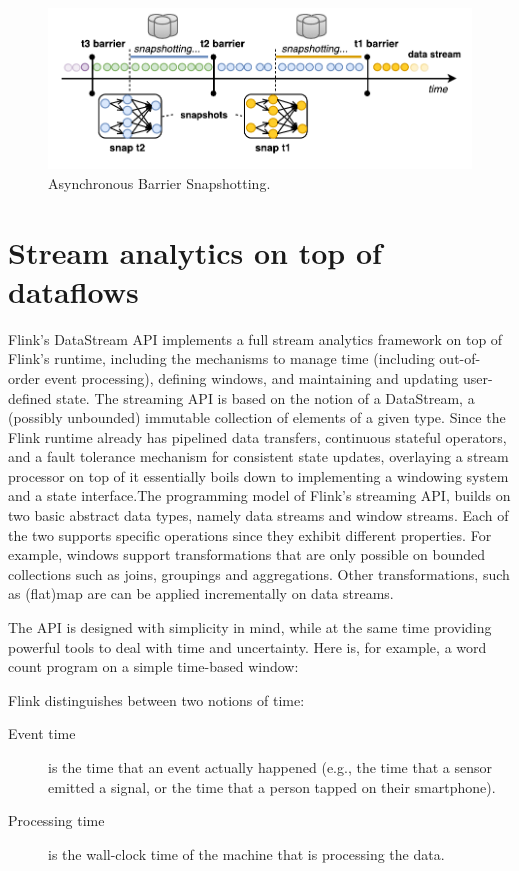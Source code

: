 \documentclass[11pt]{article}
\begin{document}
\begin{figure}[h!]
	\centering  	
  	\includegraphics[width=.45\textwidth]{figs/snaps.pdf}
	\caption{Asynchronous Barrier Snapshotting.}
	\label{fig:FlinkStack}
\end{figure}


\section{Stream analytics on top of \\ dataflows}

Flink's DataStream API implements a full stream analytics framework on top of Flink's runtime, including the mechanisms to manage time (including out-of-order event processing), defining windows, and maintaining and updating user-defined state. The streaming API is based on the notion of a DataStream, a (possibly unbounded) immutable collection of elements of a given type. Since the Flink runtime already has pipelined data transfers, continuous stateful operators, and a fault tolerance mechanism for consistent state updates, overlaying a stream processor on top of it essentially boils down to implementing a windowing system and a state interface.The programming model of Flink's streaming API,  builds on two basic abstract data types, namely data streams and window streams. Each of the two supports specific operations since they exhibit different properties. For example, windows support transformations that are only possible on bounded collections such as joins, groupings and aggregations. Other transformations, such as (flat)map are  can be applied incrementally on data streams.

The API is designed with simplicity in mind, while at the same time providing powerful tools to deal with time and uncertainty. Here is, for example, a word count program on a simple  time-based window:



Flink distinguishes between two notions of time: 
\begin{description}
\item[Event time] is the time that an event actually happened (e.g., the time that a sensor emitted a signal, or the time that a person tapped on their smartphone).
\item[Processing time] is the wall-clock time of the machine that is processing the data.
\end{description}
\end{document}
